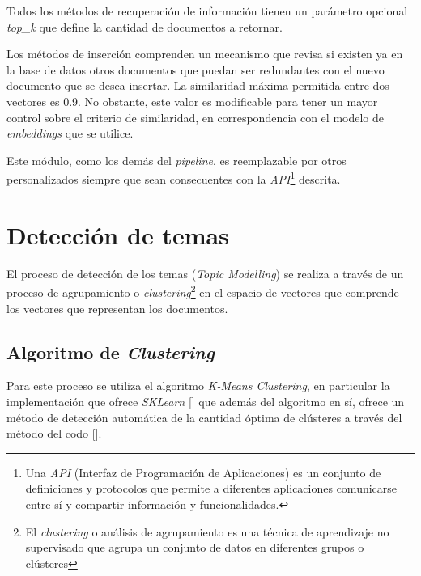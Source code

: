         Todos los métodos de recuperación de información tienen un parámetro opcional \emph{top\_k} que define la cantidad de documentos a retornar.

        Los métodos de inserción comprenden un mecanismo que revisa si existen ya en la base de datos otros documentos que puedan ser redundantes con el nuevo documento que se desea insertar. La similaridad máxima permitida entre dos vectores es 0.9. No obstante, este valor es modificable para tener un mayor control sobre el criterio de similaridad, en correspondencia con el modelo de \emph{embeddings} que se utilice.

        Este módulo, como los demás del \emph{pipeline}, es reemplazable por otros personalizados siempre que sean consecuentes con la \emph{API}\footnote{Una \emph{API} (Interfaz de Programación de Aplicaciones) es un conjunto de definiciones y protocolos que permite a diferentes aplicaciones comunicarse entre sí y compartir información y funcionalidades.} descrita.

\section{Detección de temas}
    El proceso de detección de los temas (\emph{Topic Modelling}) se realiza a través de un proceso de agrupamiento o \emph{clustering}\footnote{El \emph{clustering} o análisis de agrupamiento es una técnica de aprendizaje no supervisado que agrupa un conjunto de datos en diferentes grupos o cl\'usteres} en el espacio de vectores que comprende los vectores que representan los documentos.

    \subsection{Algoritmo de \emph{Clustering}}
        Para este proceso se utiliza el algoritmo \emph{K-Means Clustering}, en particular la implementación que ofrece \emph{SKLearn} [\cite{sklearn}] que además del algoritmo en sí, ofrece un método de detección automática de la cantidad óptima de cl\'usteres a través del método del codo [\cite{elbow}].
    
